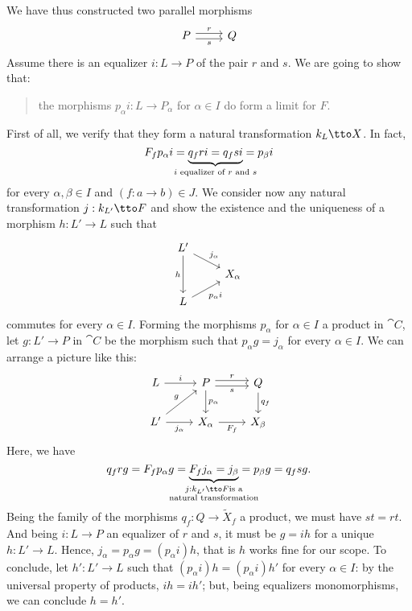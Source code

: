 We have thus constructed two parallel morphisms
\[\begin{tikzcd}
P \ar["r", r, shift left] \ar["s", r, shift right, swap] & Q
\end{tikzcd}\]
Assume there is an equalizer \(i : L \to P\) of the pair \(r\) and \(s\). We are going to show that:
\begin{quotation}
the morphisms \(p_\alpha i : L \to P_\alpha\) for \(\alpha \in I\) do form a limit for \(F\).
\end{quotation}
First of all, we verify that they form a natural transformation \(k_L \tto X\). In fact,
\[F_f p_\alpha i = \underbrace{q_f r i = q_f s i}_{\mathclap{i \text{ equalizer of } r \text{ and } s}} = p_\beta i\]
for every \(\alpha, \beta \in I\) and \((f : a \to b) \in J\). We consider now any natural transformation \(j : k_{L'} \tto F\) and show the existence and the uniqueness of a morphism \(h : L' \to L\) such that
\[\begin{tikzcd}[row sep=small]
L' \ar["{j_\alpha}", dr] \ar["h", dd, swap] \\
& X_\alpha \\
L \ar["{p_\alpha i}", ur, swap]
\end{tikzcd}\]
commutes for every \(\alpha \in I\). Forming the morphisms \(p_\alpha\) for \(\alpha \in I\) a product in \(\cat C\), let \(g : L' \to P\) in \(\cat C\) be the morphism such that \(p_\alpha g = j_\alpha\) for every \(\alpha \in I\). We can arrange a picture like this:
\[\begin{tikzcd}
L \ar["i", r] & P \ar["r", r, shift left] \ar["s", r, shift right, swap] \ar["{p_\alpha}", d] & Q \ar["{q_f}", d] \\
L' \ar["{j_\alpha}", r, swap] \ar["g", ur] & X_\alpha \ar["{F_f}", r, swap] & X_\beta
\end{tikzcd}\]
Here, we have
\[q_f r g = F_f p_\alpha g = \underbrace{F_f j_\alpha = j_\beta}_{\mathclap{\substack{j : k_{L'} \tto F \text{is a} \\ \text{natural transformation}}}} = p_\beta g = q_f s g .\]
Being the family of the morphisms \(q_f : Q \to \tilde X_f\) a product, we must have \(s t = r t\). And being \(i : L \to P\) an equalizer of \(r\) and \(s\), it must be \(g = i h\) for a unique \(h : L' \to L\). Hence, \(j_\alpha = p_\alpha g = (p_\alpha i) h\), that is \(h\) works fine for our scope. To conclude, let \(h' : L' \to L\) such that \((p_\alpha i) h = (p_\alpha i ) h'\) for every \(\alpha \in I\): by the universal property of products, \(i h = i h'\); but, being equalizers monomorphisms, we can conclude \(h = h'\).

